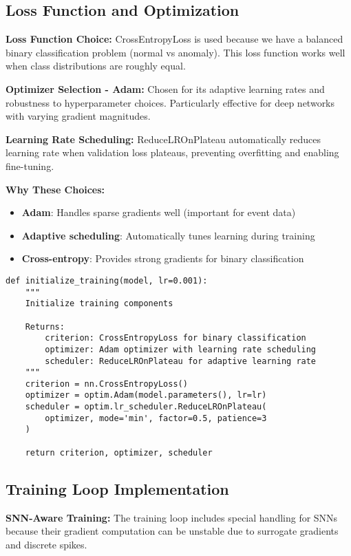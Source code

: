 \documentclass[12pt,a4paper]{article}
\begin{document}
\subsection{Loss Function and Optimization}

\textbf{Loss Function Choice:} CrossEntropyLoss is used because we have a balanced binary classification problem (normal vs anomaly). This loss function works well when class distributions are roughly equal.

\textbf{Optimizer Selection - Adam:} Chosen for its adaptive learning rates and robustness to hyperparameter choices. Particularly effective for deep networks with varying gradient magnitudes.

\textbf{Learning Rate Scheduling:} ReduceLROnPlateau automatically reduces learning rate when validation loss plateaus, preventing overfitting and enabling fine-tuning.

\textbf{Why These Choices:}
\begin{itemize}
    \item \textbf{Adam}: Handles sparse gradients well (important for event data)
    \item \textbf{Adaptive scheduling}: Automatically tunes learning during training
    \item \textbf{Cross-entropy}: Provides strong gradients for binary classification
\end{itemize}

\begin{lstlisting}[caption={Training Configuration - Optimization Setup}]
def initialize_training(model, lr=0.001):
    """
    Initialize training components

    Returns:
        criterion: CrossEntropyLoss for binary classification
        optimizer: Adam optimizer with learning rate scheduling
        scheduler: ReduceLROnPlateau for adaptive learning rate
    """
    criterion = nn.CrossEntropyLoss()
    optimizer = optim.Adam(model.parameters(), lr=lr)
    scheduler = optim.lr_scheduler.ReduceLROnPlateau(
        optimizer, mode='min', factor=0.5, patience=3
    )

    return criterion, optimizer, scheduler
\end{lstlisting}

\subsection{Training Loop Implementation}

\textbf{SNN-Aware Training:} The training loop includes special handling for SNNs because their gradient computation can be unstable due to surrogate gradients and discrete spikes.
\end{document}
